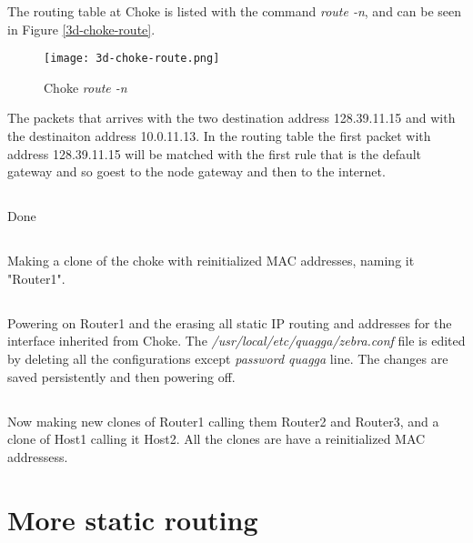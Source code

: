 \documentclass{article}
\begin{document}
The routing table at Choke is listed with the command \textit{route -n}, and can be seen in Figure \ref{3d-choke-route}. 

\begin{figure}[!h]
    \texttt{[image: 3d-choke-route.png]}
    \caption{Choke \textit{route -n}}
    \label{fig:3d-choke-route}
\end{figure}

The packets that arrives with the two destination address 128.39.11.15 and with the destinaiton address 10.0.11.13. In the routing table the first packet with address 128.39.11.15 will be matched with the first rule that is the default gateway and so goest to the node gateway and then to the  internet.

\subsection{}
Done

\subsection{}
Making a clone of the choke with reinitialized MAC addresses, naming it "Router1". 


\subsection{}

Powering on Router1 and the erasing all static IP routing and addresses for the interface inherited from Choke. The \textit{/usr/local/etc/quagga/zebra.conf} file is edited by deleting all the configurations except \textit{password quagga} line. The changes are saved persistently and then powering off. 

\subsection{}
Now making new clones of Router1 calling them Router2 and Router3, and a clone of Host1 calling it Host2. All the clones are have a reinitialized MAC addressess. 

\section{More static routing}

\subsection{}
\end{document}
